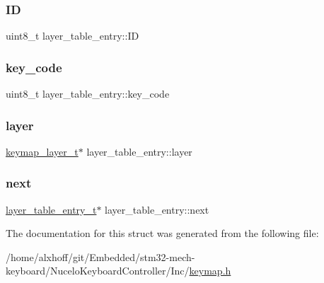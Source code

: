 \mbox{\label{structlayer__table__entry_a1f5eedb697b3cc9b8e9a8a3509afcd48}} 
\subsubsection{\texorpdfstring{ID}{ID}}
{\footnotesize\ttfamily uint8\+\_\+t layer\+\_\+table\+\_\+entry\+::\+ID}

\mbox{\label{structlayer__table__entry_a5e005ec5b39090b44fd17e45a96b8981}} 
\subsubsection{\texorpdfstring{key\+\_\+code}{key\_code}}
{\footnotesize\ttfamily uint8\+\_\+t layer\+\_\+table\+\_\+entry\+::key\+\_\+code}

\mbox{\label{structlayer__table__entry_ab47f15c7f3a4025f6c4f46fdaced1928}} 
\subsubsection{\texorpdfstring{layer}{layer}}
{\footnotesize\ttfamily \hyperlink{keymap_8h_a09117a6f418904d4009f63e96c2b9b92}{keymap\+\_\+layer\+\_\+t}$\ast$ layer\+\_\+table\+\_\+entry\+::layer}

\mbox{\label{structlayer__table__entry_a297619b520987d7dd119df4129aaf2ac}} 
\subsubsection{\texorpdfstring{next}{next}}
{\footnotesize\ttfamily \hyperlink{keymap_8h_ab39f612aa4dc85545562fc906ed5f100}{layer\+\_\+table\+\_\+entry\+\_\+t}$\ast$ layer\+\_\+table\+\_\+entry\+::next}



The documentation for this struct was generated from the following file\+:\begin{DoxyCompactItemize}
\item 
/home/alxhoff/git/\+Embedded/stm32-\/mech-\/keyboard/\+Nucelo\+Keyboard\+Controller/\+Inc/\hyperlink{keymap_8h}{keymap.\+h}\end{DoxyCompactItemize}
